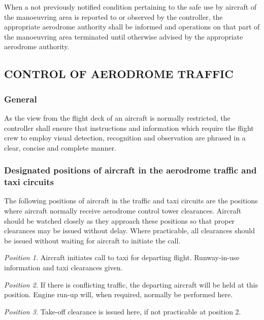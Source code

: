 \begin{enumnoss}

    \item When a not previously notified condition pertaining to the safe use by aircraft of the manoeuvring area is reported to or observed by the controller, the appropriate aerodrome authority shall be informed and operations on that part of the manoeuvring area terminated until otherwise advised by the appropriate aerodrome authority.
\end{enumnoss}

\subsection[Control of aerodrome traffic]{CONTROL OF AERODROME TRAFFIC}

\subsubsection{General}

As the view from the flight deck of an aircraft is normally restricted, the controller shall ensure that instructions and information which require the flight crew to employ visual detection, recognition and observation are phrased in a clear, concise and complete manner.

\subsubsection{Designated positions of aircraft in the aerodrome traffic and taxi circuits} \label{7.6.2}

The following positions of aircraft in the traffic and taxi circuits are the positions where aircraft normally receive aerodrome control tower clearances. Aircraft should be watched closely as they approach these positions so that proper clearances may be issued without delay. Where practicable, all clearances should be issued without waiting for aircraft to initiate the call.

\textit{Position 1.} Aircraft initiates call to taxi for departing flight. Runway-in-use information and taxi clearances given.

\textit{Position 2.} If there is conflicting traffic, the departing aircraft will be held at this position. Engine run-up will, when required, normally be performed here.

\textit{Position 3.} Take-off clearance is issued here, if not practicable at position 2.

